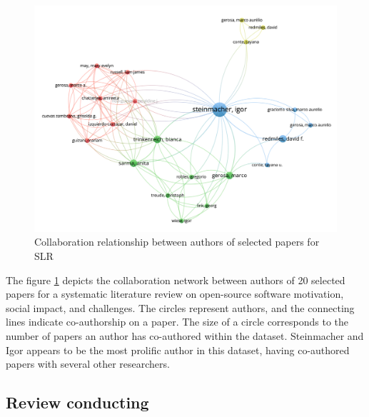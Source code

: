 \begin{figure}[ht]
    \hspace*{-0.5in}
    \centering
    \includegraphics[width=1.1\linewidth]{figs/paperRelation.png}
    \caption{Collaboration relationship between authors of selected papers for SLR}
    \label{fig:paperRelation}
\end{figure}

The figure \ref{fig:paperRelation} depicts the collaboration network between authors of 20 selected papers for a systematic literature review on open-source software motivation, social impact, and challenges. The circles represent authors, and the connecting lines indicate co-authorship on a paper. The size of a circle corresponds to the number of papers an author has co-authored within the dataset. Steinmacher and Igor  appears to be the most prolific author in this dataset, having co-authored papers with several other researchers.

\subsection{Review conducting}

